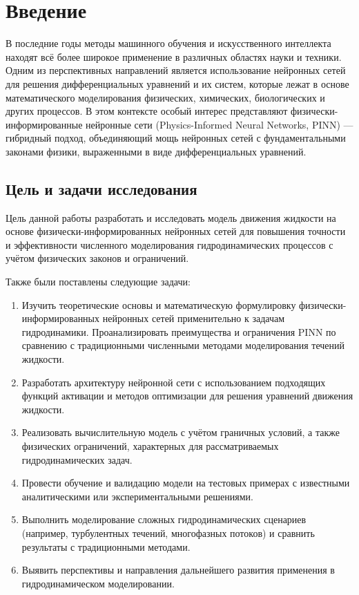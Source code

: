 \chapter{Введение}

В последние годы методы машинного обучения и искусственного интеллекта находят всё
более широкое применение в различных областях науки и техники. Одним из перспективных
направлений является использование нейронных сетей для решения дифференциальных
уравнений и их систем, которые лежат в основе математического моделирования физических,
химических, биологических и других процессов. В этом контексте особый интерес представляют
физически-информированные нейронные сети (Physics-Informed Neural Networks, PINN) ---
гибридный подход, объединяющий мощь нейронных сетей с фундаментальными законами физики,
выраженными в виде дифференциальных уравнений.

\section{Цель и задачи исследования}
Цель данной работы разработать и исследовать модель движения жидкости на основе
физически-информированных нейронных сетей для повышения точности и эффективности
численного моделирования гидродинамических процессов с учётом физических законов
и ограничений.

Также были поставлены следующие задачи:
\begin{enumerate}
    \item Изучить теоретические основы и математическую формулировку физически-информированных
    нейронных сетей применительно к задачам гидродинамики.
    Проанализировать преимущества и ограничения PINN по сравнению с традиционными численными
    методами моделирования течений жидкости.
    
    \item Разработать архитектуру нейронной сети с использованием подходящих функций активации и
    методов оптимизации для решения уравнений движения жидкости.
    
    \item Реализовать вычислительную модель с учётом граничных условий, а также
    физических ограничений, характерных для рассматриваемых гидродинамических задач.
    
    \item Провести обучение и валидацию модели на тестовых примерах с известными аналитическими
    или экспериментальными решениями.
    
    \item Выполнить моделирование сложных гидродинамических сценариев (например, турбулентных
    течений, многофазных потоков) и сравнить результаты с традиционными методами.
    
    \item Выявить перспективы и направления дальнейшего развития применения  в
    гидродинамическом моделировании.
\end{enumerate}
